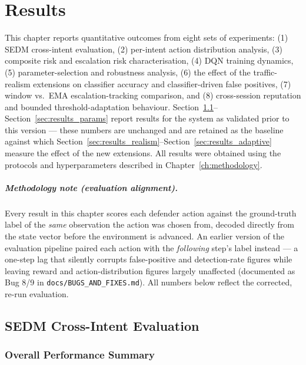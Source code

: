 \chapter{Results}
\label{ch:results}

This chapter reports quantitative outcomes from eight sets of experiments:
(1) SEDM cross-intent evaluation,
(2) per-intent action distribution analysis,
(3) composite risk and escalation risk characterisation,
(4) DQN training dynamics,
(5) parameter-selection and robustness analysis,
(6) the effect of the traffic-realism extensions on classifier accuracy and
classifier-driven false positives,
(7) window vs.\ EMA escalation-tracking comparison, and
(8) cross-session reputation and bounded threshold-adaptation behaviour.
Section~\ref{sec:results_sedm}--Section~\ref{sec:results_params} report
results for the system as validated prior to this version — these numbers
are unchanged and are retained as the baseline against which
Section~\ref{sec:results_realism}--Section~\ref{sec:results_adaptive}
measure the effect of the new extensions.
All results were obtained using the protocols and hyperparameters described
in Chapter~\ref{ch:methodology}.

\paragraph{Methodology note (evaluation alignment).} Every result in this
chapter scores each defender action against the ground-truth label of the
\emph{same} observation the action was chosen from, decoded directly from
the state vector before the environment is advanced. An earlier version of
the evaluation pipeline paired each action with the \emph{following} step's
label instead — a one-step lag that silently corrupts false-positive and
detection-rate figures while leaving reward and action-distribution figures
largely unaffected (documented as Bug 8/9 in \texttt{docs/BUGS\_AND\_FIXES.md}).
All numbers below reflect the corrected, re-run evaluation.

\section{SEDM Cross-Intent Evaluation}
\label{sec:results_sedm}

\subsection{Overall Performance Summary}


